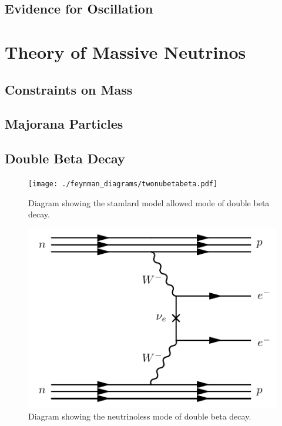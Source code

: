\documentclass[herrin-thesis.tex]{subfiles}
\begin{document}
\subsection{Evidence for Oscillation}

\section{Theory of Massive Neutrinos}
\subsection{Constraints on Mass}

\subsection{Majorana Particles}

\subsection{Double Beta Decay}

\begin{figure}
	\centering
	\texttt{[image: ./feynman\_diagrams/twonubetabeta.pdf]}
	\caption[Diagram of \(2\nu\beta\beta\)]{Diagram showing the standard model allowed mode of double beta decay.}
	\label{fig:diagram_2nubb}
\end{figure}
\begin{figure}
	\centering
	\includegraphics[width=0.6\columnwidth]{./feynman_diagrams/zeronubetabeta.pdf}
	\caption[Diagram of \(0\nu\beta\beta\)]{Diagram showing the neutrinoless mode of double beta decay.}
	\label{fig:diagram_0nubb}
\end{figure}
\end{document}
